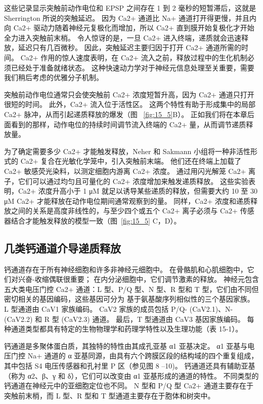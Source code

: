 这些记录显示突触前动作电位和 EPSP 之间存在 1 到 2 毫秒的短暂滞后，这就是 Sherrington 所说的突触延迟。
因为 Ca2+ 通道比 Na+ 通道打开得更慢，并且内向 Ca2+ 驱动力随着神经元复极化而增加，所以 Ca2+ 直到膜开始复极化才开始全力进入突触前末梢。
令人惊讶的是，一旦 Ca2+ 进入终端，递质就会迅速释放，延迟只有几百微秒。
因此，突触延迟主要归因于打开 Ca2+ 通道所需的时间。
Ca2+ 作用的惊人速度表明，在 Ca2+ 流入之前，释放过程中的生化机制必须已经处于准备就绪状态。 
这种快速动力学对于神经元信息处理至关重要，需要我们稍后考虑的优雅分子机制。


突触前动作电位通常只会使突触前 Ca2+ 浓度短暂升高，因为 Ca2+ 通道只打开很短的时间。 
此外，Ca2+ 流入位于活性区。 这两个特性有助于形成集中的局部 Ca2+ 脉冲，从而引起递质释放的爆发（图 ~\ref{fig:15_5}B）。 
正如我们将在本章后面看到的那样，动作电位的持续时间调节流入终端的 Ca2+ 量，从而调节递质释放量。


为了确定需要多少 Ca2+ 才能触发释放，Neher 和 Sakmann 小组将一种非活性形式的 Ca2+ 复合在光敏化学笼中，引入突触前末端。
他们还在终端上加载了 Ca2+ 敏感荧光染料，以测定细胞内游离 Ca2+ 浓度。
通过用闪光解笼 Ca2+ 离子，它们可以通过均匀且可量化的 Ca2+ 浓度增加来触发递质释放。
这些实验表明，Ca2+ 浓度升高小于 1 μM 就足以诱导某些递质的释放，但需要大约 10 至 30 μM Ca2+ 才能释放在动作电位期间通常观察到的量。
同样，Ca2+ 浓度和递质释放之间的关系是高度非线性的，与至少四个或五个 Ca2+ 离子必须与 Ca2+ 传感器结合才能触发释放的模型一致（图~\ref{fig:15_5} C，D）。



\subsection{几类钙通道介导递质释放}

钙通道存在于所有神经细胞和许多非神经元细胞中。 
在骨骼肌和心肌细胞中，它们对兴奋-收缩偶联很重要； 在内分泌细胞中，它们调节激素的释放。
神经元包含五大类电压门控 Ca2+ 通道：L 型、P/Q 型、N 型、R 型和 T 型，它们由不同但密切相关的基因编码，这些基因可分为 基于氨基酸序列相似性的三个基因家族。
L 型通道由 CaV1 家族编码。
CaV2 家族的成员包括 P/Q- (CaV2.1)、N- (CaV2.2) 和 R 型 (CaV2.3) 通道。
最后，T 型通道由 CaV3 基因家族编码。 
每种通道类型都具有特定的生物物理学和药理学特性以及生理功能（表 15-1）。


钙通道是多聚体蛋白质，其独特的特性由其成孔亚基 α1 亚基决定。
α1 亚基与电压门控 Na+ 通道的 α 亚基同源，由具有六个跨膜区段的结构域的四个重复组成，其中包括 S4 电压传感器和孔衬里 P 区（参见图 8 –10)。
钙通道还具有辅助亚基（称为 α2、β、γ 和 δ），它们可以改变由 α1 亚基形成的通道的特性。
不同类型的钙通道在神经元中的亚细胞定位也不同。
N 型和 P/Q 型 Ca2+ 通道主要存在于突触前末梢，而 L 型、R 型和 T 型通道主要存在于胞体和树突中。


